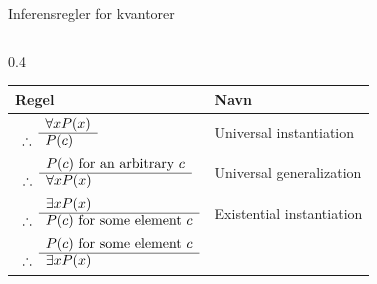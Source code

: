 \begin{frame}{Inferensregler for kvantorer}
    \pause
    \begin{columns}
        \begin{column}{0.4\textwidth}
            \begin{tabular}{>{\footnotesize}m{3.5cm} | >{\small}m{2cm}}
                \textbf{Regel}& \textbf{Navn} \\ \hline
                \noalign{\vspace{3pt}}
                $\begin{array}{ r l }
                    & \forall x P(x) \\
                    \cline{2-2}
                    \therefore & P(c)
                \end{array}$
                & Universal \newline instantiation\\ \noalign{\vspace{3pt}}  \hline
                \noalign{\vspace{3pt}}
                $\begin{array}{ r l }
                    & P(c) \text{ for an arbitrary } c\\
                    \cline{2-2}
                    \therefore & \forall x P(x)
                \end{array}$
                & Universal \newline generalization\\ \noalign{\vspace{3pt}} \hline
                \noalign{\vspace{3pt}}
                $\begin{array}{ r l }
                    & \exists x P(x) \\
                    \cline{2-2}
                    \therefore & P(c) \text{ for some element } c
                \end{array}$
                & Existential \newline instantiation \\ \noalign{\vspace{3pt}} \hline
                \noalign{\vspace{3pt}}
                $\begin{array}{ r l }
                        & P(c) \text{ for some element } c \\
                        \cline{2-2}
                        \therefore & \exists x P(x)
                    \end{array}$

\end{tabular}
\end{column}
\end{columns}
\end{frame}
